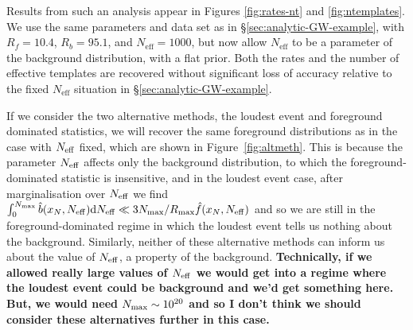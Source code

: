 \documentclass[aps,prd]{revtex4-1}
\newcommand{\ilya}[1]{{\color{red} \bf #1}}
\newcommand{\jon}[1]{{\color{green} \bf  #1}}
\begin{document}
Results from such an analysis appear in Figures \ref{fig:rates-nt} and
\ref{fig:ntemplates}.  We use the same parameters and data set as in
\S \ref{sec:analytic-GW-example}, with $R_f = 10.4$, $R_b = 95.1$, and
$N_\mathrm{eff} = 1000$, but now allow $N_\mathrm{eff}$ to be a
parameter of the background distribution, with a flat prior.  Both the
rates and the number of effective templates are recovered without
significant loss of accuracy relative to the fixed $N_\mathrm{eff}$
situation in \S \ref{sec:analytic-GW-example}.

If we consider the two alternative methods, the loudest event and foreground dominated statistics, we will recover the same foreground distributions as in the case with $N_{\rm eff}$ fixed, which are shown in Figure~\ref{fig:altmeth}. This is because the parameter $N_{\rm eff}$ affects only the background distribution, to which the foreground-dominated statistic is insensitive, and in the loudest event case, after marginalisation over $N_{\rm eff}$ we find $\int_0^{N_{\rm max}} \hat{b}(x_N,N_{\rm eff}) {\rm d}N_{\rm eff} \ll 3 N_{\rm max}/R_{\rm max}  \hat{f}(x_N, N_{\rm eff})$ and so we are still in the foreground-dominated regime in which the loudest event tells us nothing about the background. Similarly, neither of these alternative methods can inform us about the value of $N_{\rm eff}$, a property of the background. \jon{Technically, if we allowed really large values of $N_{\rm eff}$ we would get into a regime where the loudest event could be background and we'd get something here. But, we would need $N_{\rm max} \sim 10^{20}$ and so I don't think we should consider these alternatives further in this case.}

\end{document}
